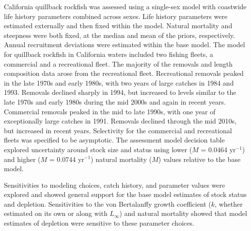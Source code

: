 \documentclass[11pt,
  english,
  letterpaper,
]{article}
\begin{document}
California quillback rockfish was assessed using a single-sex model with coastwide life history parameters combined across sexes. Life history parameters were estimated externally and then fixed within the model. Natural mortality and steepness were both fixed, at the median and mean of the priors, respectively. Annual recruitment deviations were estimated within the base model. The model for quillback rockfish in California waters included two fishing fleets, a commercial and a recreational fleet. The majority of the removals and length composition data arose from the recreational fleet. Recreational removals peaked in the late 1970s and early 1980s, with two years of large catches in 1984 and 1993. Removals declined sharply in 1994, but increased to levels similar to the late 1970s and early 1980s during the mid 2000s and again in recent years. Commercial removals peaked in the mid to late 1990s, with one year of exceptionally large catches in 1991. Removals declined through the mid 2010s, but increased in recent years. Selectivity for the commercial and recreational fleets was specified to be asymptotic. The assessment model decision table explored uncertainty around stock size and status using lower ({\(M\)\leavevmode\tagmcend\tagstructend} = 0.0464 yr{\(^{-1}\)\leavevmode\tagmcend\tagstructend}) and higher ({\(M\)\leavevmode\tagmcend\tagstructend} = 0.0744 yr{\(^{-1}\)\leavevmode\tagmcend\tagstructend}) natural mortality ({\(M\)\leavevmode\tagmcend\tagstructend}) values relative to the base model.

\leavevmode\tagmcend\tagstructend\par


Sensitivities to modeling choices, catch history, and parameter values were explored and showed general support for the base model estimates of stock status and depletion. Sensitivities to the von Bertalanffy growth coefficient ({\(k\)\leavevmode\tagmcend\tagstructend}, whether estimated on its own or along with {\(L_\infty\)\leavevmode\tagmcend\tagstructend}) and natural mortality showed that model estimates of depletion were sensitive to these parameter choices.
\end{document}
